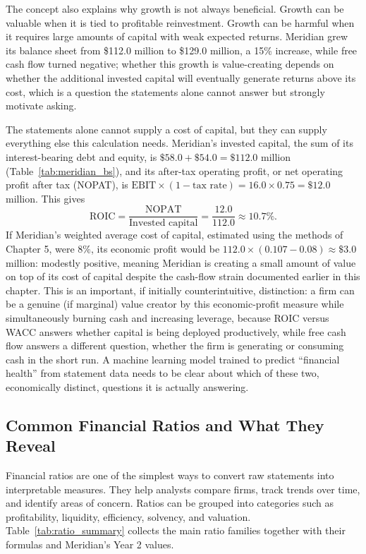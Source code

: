 \documentclass[../ai_in_finance]{subfiles}
\begin{document}
The concept also explains why growth is not always beneficial. Growth can be valuable when it is tied to profitable reinvestment. Growth can be harmful when it requires large amounts of capital with weak expected returns. Meridian grew its balance sheet from \$112.0 million to \$129.0 million, a 15\% increase, while free cash flow turned negative; whether this growth is value-creating depends on whether the additional invested capital will eventually generate returns above its cost, which is a question the statements alone cannot answer but strongly motivate asking.

The statements alone cannot supply a cost of capital, but they can supply everything else this calculation needs. Meridian's invested capital, the sum of its interest-bearing debt and equity, is $\$58.0 + \$54.0 = \$112.0$ million (Table~\ref{tab:meridian_bs}), and its after-tax operating profit, or net operating profit after tax (NOPAT), is $\text{EBIT} \times (1 - \text{tax rate}) = 16.0 \times 0.75 = \$12.0$ million. This gives
\begin{equation*}
\text{ROIC} = \frac{\text{NOPAT}}{\text{Invested capital}} = \frac{12.0}{112.0} \approx 10.7\%.
\end{equation*}
If Meridian's weighted average cost of capital, estimated using the methods of Chapter 5, were $8\%$, its economic profit would be $112.0 \times (0.107 - 0.08) \approx \$3.0$ million: modestly positive, meaning Meridian is creating a small amount of value on top of its cost of capital despite the cash-flow strain documented earlier in this chapter. This is an important, if initially counterintuitive, distinction: a firm can be a genuine (if marginal) value creator by this economic-profit measure while simultaneously burning cash and increasing leverage, because ROIC versus WACC answers whether capital is being deployed productively, while free cash flow answers a different question, whether the firm is generating or consuming cash in the short run. A machine learning model trained to predict ``financial health'' from statement data needs to be clear about which of these two, economically distinct, questions it is actually answering.

\subsection{Common Financial Ratios and What They Reveal}
\label{sec:ratios}

Financial ratios are one of the simplest ways to convert raw statements into interpretable measures. They help analysts compare firms, track trends over time, and identify areas of concern. Ratios can be grouped into categories such as profitability, liquidity, efficiency, solvency, and valuation. Table~\ref{tab:ratio_summary} collects the main ratio families together with their formulas and Meridian's Year 2 values.
\end{document}
